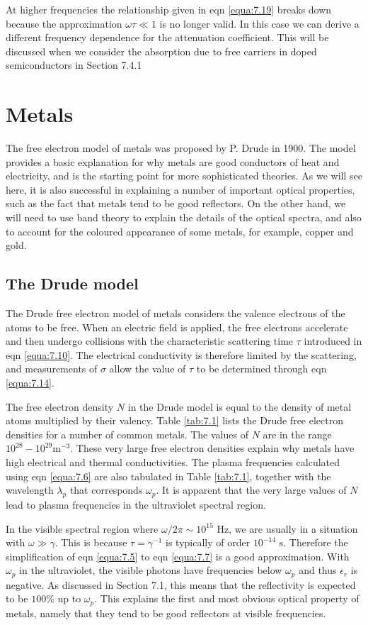 \documentclass[12pt]{book}
\begin{document}
At higher frequencies the relationship given in eqn \ref{equa:7.19} breaks down because the approximation $\omega\tau\ll 1$ is no longer valid. In this case we can derive a different frequency dependence for the attenuation coefficient. This will be discussed when we consider the absorption due to free carriers in doped semiconductors in Section 7.4.1

\section{Metals}
The free electron model of metals was proposed by P. Drude in 1900. The model provides a basic explanation for why metals are good conductors of heat and electricity, and is the starting point for more sophisticated theories. As we will see here, it is also successful in explaining a number of important optical properties, such as the fact that metals tend to be good reflectors. On the other hand, we will need to use band theory to explain the details of the optical spectra, and also to account for the coloured appearance of some metals, for example, copper and gold.

\subsection{The Drude model}
The Drude free electron model of metals considers the valence electrons of the atoms to be free. When an electric field is applied, the free electrons accelerate and then undergo collisions with the characteristic scattering time $\tau$ introduced in eqn \ref{equa:7.10}. The electrical conductivity is therefore limited by the scattering, and measurements of $\sigma$ allow the value of $\tau$ to be determined through eqn \ref{equa:7.14}.

The free electron density $N$ in the Drude model is equal to the density of metal atoms multiplied by their valency. Table \ref{tab:7.1} lists the Drude free electron densities for a number of common metals. The values of $N$ are in the range $10^{28}-10^{29} \mathrm{m}^{-3}$. These very large free electron densities explain why metals have high electrical and thermal conductivities. The plasma frequencies calculated using eqn \ref{equa:7.6} are also tabulated in Table \ref{tab:7.1}, together with the wavelength $\lambda_p$ that corresponds $\omega_p$. It is apparent that the very large values of $N$ lead to plasma frequencies in the ultraviolet spectral region.

In the visible spectral region where $\omega/2\pi\sim10^{15}$ Hz, we are usually in a situation with $\omega\gg\gamma$. This is because $\tau=\gamma^{-1}$ is typically of order $10^{-14}$ s. Therefore the simplification of eqn \ref{equa:7.5} to eqn \ref{equa:7.7} is a good approximation. With $\omega_p$ in the ultraviolet, the visible photons have frequencies below $\omega_p$ and thus $\epsilon_r$ is negative. As discussed in Section 7.1, this means that the reflectivity is expected to be $100\%$ up to $\omega_p$. This explains the first and most obvious optical property of metals, namely that they tend to be good reflectors at visible frequencies.
\end{document}
